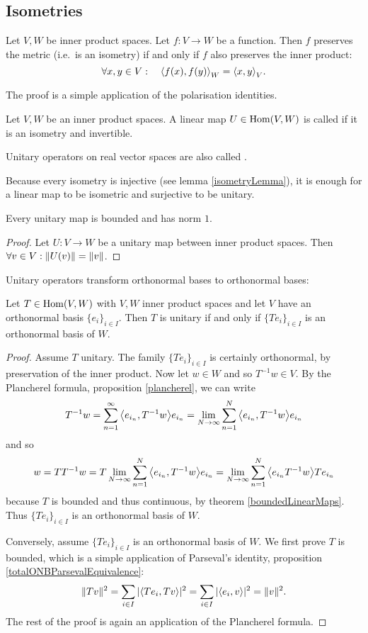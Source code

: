 \subsection{Isometries}
\begin{lemma}
Let $V,W$ be inner product spaces. Let $f:V\to W$ be a function. Then $f$ preserves the metric (i.e.\ is an isometry) \textup{if and only if} $f$ also preserves the inner product:
\[ \forall x,y \in V: \quad \inner{f(x),f(y)}_W = \inner{x,y}_V. \]
\end{lemma}
The proof is a simple application of the polarisation identities.

\begin{definition}
Let $V,W$ be an inner product spaces. A linear map $U\in\operatorname{Hom}(V,W)$ is called  if it is an isometry and invertible.

Unitary operators on real vector spaces are also called .
\end{definition}
Because every isometry is injective (see lemma \ref{isometryLemma}), it is enough for a linear map to be isometric and surjective to be unitary.

\begin{lemma}
Every unitary map is bounded and has norm $1$.
\end{lemma}
\begin{proof}
Let $U: V\to W$ be a unitary map between inner product spaces. Then $\forall v\in V: \lVert U(v)\rVert = \lVert v\rVert$.
\end{proof}

Unitary operators transform orthonormal bases to orthonormal bases:
\begin{proposition}
Let $T\in \operatorname{Hom}(V,W)$ with $V,W$ inner product spaces and let $V$ have an orthonormal basis $\{e_i\}_{i\in I}$. Then $T$ is unitary \textup{if and only if} $\{Te_i\}_{i\in I}$ is an orthonormal basis of $W$.
\end{proposition}
\begin{proof}
Assume $T$ unitary. The family $\{Te_i\}_{i\in I}$ is certainly orthonormal, by preservation of the inner product. Now let $w\in W$ and so $T^{-1}w\in V$. By the Plancherel formula, proposition \ref{plancherel}, we can write
\[ T^{-1}w = \sum_{n=1}^\infty \inner{e_{i_n},T^{-1}w}e_{i_n} = \lim_{N\to\infty}\sum_{n=1}^N \inner{e_{i_n},T^{-1}w}e_{i_n} \]
and so
\[ w = TT^{-1}w = T\lim_{N\to\infty}\sum_{n=1}^N \inner{e_{i_n},T^{-1}w}e_{i_n} = \lim_{N\to\infty}\sum_{n=1}^N \inner{e_{i_n}T^{-1}w}Te_{i_n} \]
because $T$ is bounded and thus continuous, by theorem \ref{boundedLinearMaps}.
Thus $\{Te_i\}_{i\in I}$ is an orthonormal basis of $W$.

Conversely, assume $\{Te_i\}_{i\in I}$ is an orthonormal basis of $W$. We first prove $T$ is bounded, which is a simple application of Parseval's identity, proposition \ref{totalONBParsevalEquivalence}:
\[ \norm{Tv}^2 = \sum_{i\in I}|\inner{Te_i,Tv}|^2 = \sum_{i\in I}|\inner{e_i,v}|^2 = \norm{v}^2. \]
The rest of the proof is again an application of the Plancherel formula.
\end{proof}

